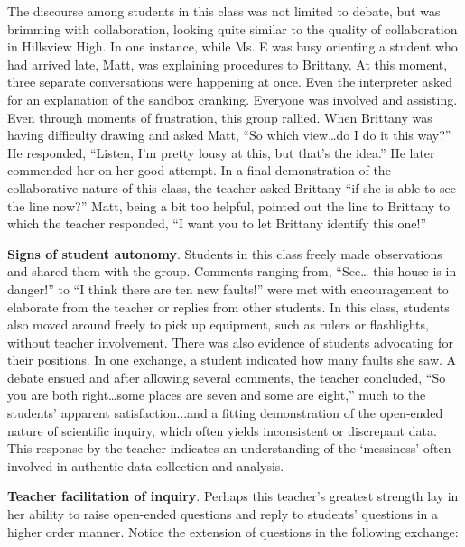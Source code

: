 \documentclass[11.5pt]{sig-alternate} %
\begin{document}
\begin{large}
The discourse among students in this class was not limited to debate, but was brimming with collaboration, looking quite similar to the quality of collaboration in Hillsview High. In one instance, while Ms. E was busy orienting a student who had arrived late, Matt, was explaining procedures to Brittany.  At this moment, three separate conversations were happening at once.  Even the interpreter asked for an explanation of the sandbox cranking.  Everyone was involved and assisting.  Even through moments of frustration, this group rallied.  When Brittany was having difficulty drawing and asked Matt, “So which view…do I do it this way?” He responded, “Listen, I’m pretty lousy at this, but that’s the idea.” He later commended her on her good attempt.  In a final demonstration of the collaborative nature of this class, the teacher asked Brittany “if she is able to see the line now?” Matt, being a bit too helpful, pointed out the line to Brittany to which the teacher responded, “I want you to let Brittany identify this one!” 

\textbf{Signs of student autonomy}. Students in this class freely made observations and shared them with the group.  Comments ranging from, “See… this house is in danger!” to “I think there are ten new faults!” were met with encouragement to elaborate from the teacher or replies from other students.  In this class, students also moved around freely to pick up equipment, such as rulers or flashlights, without teacher involvement.  There was also evidence of students advocating for their positions.  In one exchange, a student indicated how many faults she saw.  A debate ensued and after allowing several comments, the teacher concluded, “So you are both right…some places are seven and some are eight,” much to the students’ apparent satisfaction...and a fitting demonstration of the open-ended nature of scientific inquiry, which often yields inconsistent or discrepant data. This response by the teacher indicates an understanding of the ‘messiness’ often involved in authentic data collection and analysis.  

\textbf{Teacher facilitation of inquiry}. Perhaps this teacher’s greatest strength lay in her ability to raise open-ended questions and reply to students’ questions in a higher order manner.  Notice the extension of questions in the following exchange:


\end{large}
\end{document}
